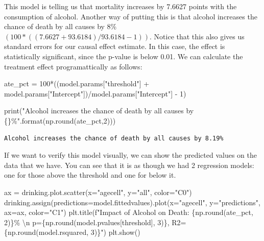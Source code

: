 \documentclass[
  letterpaper,
  DIV=11,
  numbers=noendperiod]{scrreprt}
\newenvironment{Shaded}{\begin{snugshade}}{\end{snugshade}}
\newcommand{\BuiltInTok}[1]{\textcolor[rgb]{0.00,0.23,0.31}{#1}}
\newcommand{\CharTok}[1]{\textcolor[rgb]{0.13,0.47,0.30}{#1}}
\newcommand{\DecValTok}[1]{\textcolor[rgb]{0.68,0.00,0.00}{#1}}
\newcommand{\NormalTok}[1]{\textcolor[rgb]{0.00,0.23,0.31}{#1}}
\newcommand{\OperatorTok}[1]{\textcolor[rgb]{0.37,0.37,0.37}{#1}}
\newcommand{\SpecialCharTok}[1]{\textcolor[rgb]{0.37,0.37,0.37}{#1}}
\newcommand{\SpecialStringTok}[1]{\textcolor[rgb]{0.13,0.47,0.30}{#1}}
\newcommand{\StringTok}[1]{\textcolor[rgb]{0.13,0.47,0.30}{#1}}
\begin{document}
This model is telling us that mortality increases by 7.6627 points with
the consumption of alcohol. Another way of putting this is that alcohol
increases the chance of death by all causes by 8\%
\((100*((7.6627+93.6184)/93.6184 - 1))\). Notice that this also gives us
standard errors for our causal effect estimate. In this case, the effect
is statistically significant, since the p-value is below 0.01. We can
calculate the treatment effect programattically as follows:

\begin{Shaded}
\begin{Highlighting}[]
\NormalTok{ate\_pct }\OperatorTok{=} \DecValTok{100}\OperatorTok{*}\NormalTok{((model.params[}\StringTok{"threshold"}\NormalTok{] }\OperatorTok{+}\NormalTok{ model.params[}\StringTok{"Intercept"}\NormalTok{])}\OperatorTok{/}\NormalTok{model.params[}\StringTok{"Intercept"}\NormalTok{] }\OperatorTok{{-}} \DecValTok{1}\NormalTok{)}

\BuiltInTok{print}\NormalTok{(}\StringTok{"Alcohol increases the chance of death by all causes by }\SpecialCharTok{\{\}}\StringTok{\%"}\NormalTok{.}\BuiltInTok{format}\NormalTok{(np.}\BuiltInTok{round}\NormalTok{(ate\_pct,}\DecValTok{2}\NormalTok{)))}
\end{Highlighting}
\end{Shaded}

\begin{verbatim}
Alcohol increases the chance of death by all causes by 8.19%
\end{verbatim}

If we want to verify this model visually, we can show the predicted
values on the data that we have. You can see that it is as though we had
2 regression models: one for those above the threshold and one for below
it.

\begin{Shaded}
\begin{Highlighting}[]
\NormalTok{ax }\OperatorTok{=}\NormalTok{ drinking.plot.scatter(x}\OperatorTok{=}\StringTok{"agecell"}\NormalTok{, y}\OperatorTok{=}\StringTok{"all"}\NormalTok{, color}\OperatorTok{=}\StringTok{"C0"}\NormalTok{)}
\NormalTok{drinking.assign(predictions}\OperatorTok{=}\NormalTok{model.fittedvalues).plot(x}\OperatorTok{=}\StringTok{"agecell"}\NormalTok{, y}\OperatorTok{=}\StringTok{"predictions"}\NormalTok{, ax}\OperatorTok{=}\NormalTok{ax, color}\OperatorTok{=}\StringTok{"C1"}\NormalTok{)}
\NormalTok{plt.title(}\SpecialStringTok{f"Impact of Alcohol on Death: }\SpecialCharTok{\{}\NormalTok{np}\SpecialCharTok{.}\BuiltInTok{round}\NormalTok{(ate\_pct, }\DecValTok{2}\NormalTok{)}\SpecialCharTok{\}}\SpecialStringTok{\% }\CharTok{\textbackslash{}n}\SpecialStringTok{ p=}\SpecialCharTok{\{}\NormalTok{np}\SpecialCharTok{.}\BuiltInTok{round}\NormalTok{(model.pvalues[}\StringTok{\textquotesingle{}threshold\textquotesingle{}}\NormalTok{], }\DecValTok{3}\NormalTok{)}\SpecialCharTok{\}}\SpecialStringTok{, R2=}\SpecialCharTok{\{}\NormalTok{np}\SpecialCharTok{.}\BuiltInTok{round}\NormalTok{(model.rsquared, }\DecValTok{3}\NormalTok{)}\SpecialCharTok{\}}\SpecialStringTok{"}\NormalTok{)}
\NormalTok{plt.show()}
\end{Highlighting}
\end{Shaded}
\end{document}

